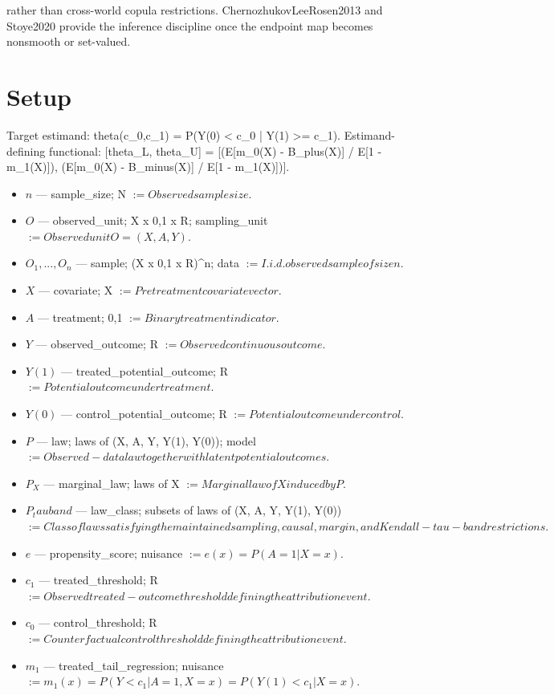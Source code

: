 \documentclass{article}
\begin{document}
rather than cross-world copula restrictions. ChernozhukovLeeRosen2013 and Stoye2020 provide the inference discipline once the endpoint map becomes nonsmooth or set-valued.

\section{Setup}

Target estimand: theta(c_0,c_1) = P(Y(0) < c_0 | Y(1) >= c_1).
Estimand-defining functional: [theta_L, theta_U] = [(E[m_0(X) - B_plus(X)] / E[1 - m_1(X)]), (E[m_0(X) - B_minus(X)] / E[1 - m_1(X)])].
\begin{itemize}
  \item $n$ --- sample_size; N $:= Observed sample size.$
  \item $O$ --- observed_unit; X x {0,1} x R; sampling_unit $:= Observed unit O = (X, A, Y).$
  \item $O_1, ..., O_n$ --- sample; (X x {0,1} x R)^n; data $:= I.i.d. observed sample of size n.$
  \item $X$ --- covariate; X $:= Pretreatment covariate vector.$
  \item $A$ --- treatment; {0,1} $:= Binary treatment indicator.$
  \item $Y$ --- observed_outcome; R $:= Observed continuous outcome.$
  \item $Y(1)$ --- treated_potential_outcome; R $:= Potential outcome under treatment.$
  \item $Y(0)$ --- control_potential_outcome; R $:= Potential outcome under control.$
  \item $P$ --- law; laws of (X, A, Y, Y(1), Y(0)); model $:= Observed-data law together with latent potential outcomes.$
  \item $P_X$ --- marginal_law; laws of X $:= Marginal law of X induced by P.$
  \item $P_tauband$ --- law_class; subsets of laws of (X, A, Y, Y(1), Y(0)) $:= Class of laws satisfying the maintained sampling, causal, margin, and Kendall-tau-band restrictions.$
  \item $e$ --- propensity_score; nuisance $:= e(x) = P(A = 1 | X = x).$
  \item $c_1$ --- treated_threshold; R $:= Observed treated-outcome threshold defining the attribution event.$
  \item $c_0$ --- control_threshold; R $:= Counterfactual control threshold defining the attribution event.$
  \item $m_1$ --- treated_tail_regression; nuisance $:= m_1(x) = P(Y < c_1 | A = 1, X = x) = P(Y(1) < c_1 | X = x).$

\end{itemize}
\end{document}
